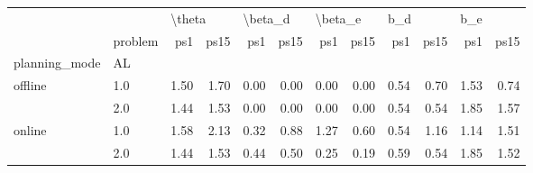 \begin{tabular}{llrrrrrrrrrr}
\toprule
       & {} & \multicolumn{2}{l}{\textbackslash theta} & \multicolumn{2}{l}{\textbackslash beta\_d} & \multicolumn{2}{l}{\textbackslash beta\_e} & \multicolumn{2}{l}{b\_d} & \multicolumn{2}{l}{b\_e} \\
       & problem &    ps1 & ps15 &     ps1 & ps15 &     ps1 & ps15 &  ps1 & ps15 &  ps1 & ps15 \\
planning\_mode & AL &        &      &         &      &         &      &      &      &      &      \\
\midrule
offline & 1.0 &   1.50 & 1.70 &    0.00 & 0.00 &    0.00 & 0.00 & 0.54 & 0.70 & 1.53 & 0.74 \\
       & 2.0 &   1.44 & 1.53 &    0.00 & 0.00 &    0.00 & 0.00 & 0.54 & 0.54 & 1.85 & 1.57 \\
online & 1.0 &   1.58 & 2.13 &    0.32 & 0.88 &    1.27 & 0.60 & 0.54 & 1.16 & 1.14 & 1.51 \\
       & 2.0 &   1.44 & 1.53 &    0.44 & 0.50 &    0.25 & 0.19 & 0.59 & 0.54 & 1.85 & 1.52 \\
\bottomrule
\end{tabular}
